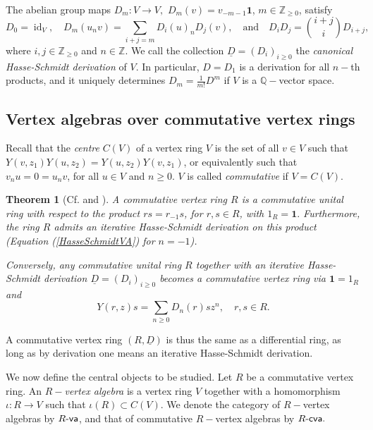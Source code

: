 \documentclass{article}
\newtheorem{thm}{Theorem}[section]
\theoremstyle{definition}
\def\id{\ensuremath{\operatorname{id}}}
\def\Rva{\ensuremath{R\text{-\textup{\textsf{va}}}}}
\def\Rcva{\ensuremath{R\text{-\textup{\textsf{cva}}}}}
\begin{document}
\cite[Sec.\@ 3]{Mason} The abelian group maps $D_m \colon V \to V,$ $D_m(v) = v_{-m-1} \mathbf 1$, $m \in \mathbb Z_{\geq 0}$, satisfy
    \begin{equation} \label{HasseSchmidtVA} D_0 = \id_V, \quad D_m(u_n v) = \sum_{i+j = m} D_i(u)_n D_j(v), \quad \text{and} \quad D_i D_j = \binom{i+j}{i} D_{i+j}, \end{equation} 
    where $i, j \in \mathbb Z_{\geq 0}$ and $n \in \mathbb Z$. 
    We call the collection $\underline D =(D_i)_{i \geq 0}$ the \emph{canonical Hasse-Schmidt derivation} of $V$.
    In particular, $D = D_1$ is a derivation for all $n-$th products, and it uniquely determines $D_m = \frac{1}{m!} D^m$ if $V$ is a $\mathbb Q-$vector space.
    
\subsection{Vertex algebras over commutative vertex rings}\label{vcvr}
      
Recall that the \textit{centre} $C(V)$ of a vertex ring $V$ is the set of all $v \in V$ such that $Y(v,z_1) Y(u,z_2) = Y(u,z_2) Y(v,z_1)$, or equivalently such that $v_n u = 0 = u_n v$, for all $u \in V$ and $n \geq 0$.
 $V$ is called \textit{commutative} if $V = C(V).$  
            
\begin{thm}[{Cf.\@ \cite[Sec.\@ 5.2]{Mason} and \cite[Sec.\@ 4]{Bor}}] \label{masonord} 
	A commutative vertex ring $R$ is a commutative unital ring with respect to the product $rs = r_{-1} s$, for $r,s \in R$, with $1_R = \mathbf 1.$ Furthermore, the ring $R$ admits an iterative Hasse-Schmidt derivation on this product (Equation (\ref{HasseSchmidtVA}) for $n = -1$).

    Conversely, any commutative unital ring $R$ together with an iterative Hasse-Schmidt derivation $\underline D = (D_i)_{i \geq 0}$ becomes a commutative vertex ring via $\mathbf 1 = 1_R$ and
    \[Y(r,z) s = \sum_{n \geq 0} D_n(r) s z^n, \quad r,s \in R.\]
\end{thm}

 A commutative vertex ring $(R,\underline{D})$ is thus the same as a  differential ring, as long as by derivation one means an iterative Hasse-Schmidt derivation.  

\medskip

We now define the central objects to be studied. Let $R$ be a commutative vertex ring.
   An \emph{$R-$vertex algebra} is a vertex ring $V$ together with a homomorphism $\iota \colon R \to V$ such that $\iota(R) \subset C(V)$. We denote the category of $R-$vertex algebras by $\Rva$, and that of commutative $R-$vertex algebras by $\Rcva.$
\end{document}
